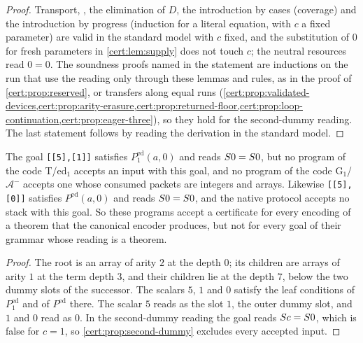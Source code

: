 \begin{proof}
Transport, , the elimination of $D$, the introduction by cases
(coverage) and the introduction by progress (induction for a literal equation, with
$c$ a fixed parameter) are valid in the standard model with $c$ fixed, and the
substitution of $0$ for fresh parameters in \cref{cert:lem:supply} does not touch
$c$; the neutral resources read $0=0$. The soundness proofs named in the statement are
inductions on the run that use the reading only through these lemmas and rules, as in
the proof of \cref{cert:prop:reserved}, or transfers along equal runs
(\cref{cert:prop:validated-devices,cert:prop:arity-erasure,cert:prop:returned-floor,cert:prop:loop-continuation,cert:prop:eager-three}),
so they hold for the second-dummy reading. The last statement follows by reading the
derivation in the standard model.
\end{proof}

\begin{corollary}\label{cert:cor:second-dummy}
The goal \texttt{[[5],[1]]} satisfies $P^{\mathrm{ed}}_{1}(a,0)$ and reads
$S 0=S 0$, but no program of the code T/ed$_1$ accepts an input with this goal,
and no program of the code G$_1$/$\mathcal A^{-}$ accepts one whose consumed packets
are integers and arrays. Likewise \texttt{[[5],[0]]} satisfies
$P^{\mathrm{ed}}(a,0)$ and reads $S 0=S 0$, and the native protocol accepts no
stack with this goal. So these programs accept a certificate for every encoding of a
theorem that the canonical encoder produces, but not for every goal of their grammar
whose reading is a theorem.
\end{corollary}
\begin{proof}
The root is an array of arity $2$ at the depth $0$; its children are arrays of arity
$1$ at the term depth $3$, and their children lie at the depth $7$, below the two
dummy slots of the successor. The scalars $5$, $1$ and $0$ satisfy the leaf
conditions of $P^{\mathrm{ed}}_{1}$ and of $P^{\mathrm{ed}}$ there. The scalar $5$ reads
as the slot $1$, the outer dummy slot, and $1$ and $0$ read as $0$. In the
second-dummy reading the goal reads $S c=S 0$, which is false for $c=1$, so
\cref{cert:prop:second-dummy} excludes every accepted input.
\end{proof}


